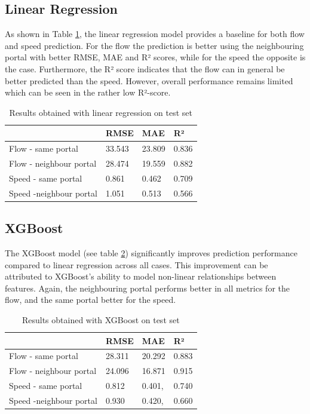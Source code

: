 	\subsection{Linear Regression}
	As shown in Table \ref{tab:result_linear}, the linear regression model provides a baseline for both flow and speed prediction.
	For the flow the prediction is better using the neighbouring portal with better RMSE, MAE and R² scores, while for the speed the opposite is the case. 
	Furthermore, the R² score indicates that the flow can in general be better predicted than the speed. 
	However, overall performance remains limited which can be seen in the rather low R²-score.
	\begin{table}[H]
		\centering
		\caption{Results obtained with linear regression on test set}
		\label{tab:result_linear}
		\begin{tabular}{l|lll}
			& RMSE   & MAE    & R²    \\
			\hline 
			Flow - same portal      & 33.543 & 23.809 & 0.836 \\
			Flow - neighbour portal & 28.474 & 19.559 & 0.882 \\
			Speed - same portal     & 0.861  & 0.462  & 0.709 \\
			Speed -neighbour portal & 1.051  & 0.513  & 0.566
		\end{tabular}
	\end{table}
	\subsection{XGBoost}
	The XGBoost model (see table \ref{tab:result_xgb}) significantly improves prediction performance compared to linear regression across all cases. This improvement can be attributed to XGBoost's ability to model non-linear relationships between features.
	Again, the neighbouring portal performs better in all metrics for the flow, and the same portal better for the speed.
	\begin{table}[H]
		\centering
		\caption{Results obtained with XGBoost on test set}
		\label{tab:result_xgb}
		\begin{tabular}{l|lll}
			& RMSE   & MAE    & R²    \\
			\hline
			Flow - same portal      &28.311 & 20.292& 0.883 \\
			Flow - neighbour portal &  24.096 & 16.871 & 0.915 \\
			Speed - same portal     & 0.812 &0.401, &0.740 \\
			Speed -neighbour portal & 0.930&0.420, & 0.660
		\end{tabular}
	\end{table}

